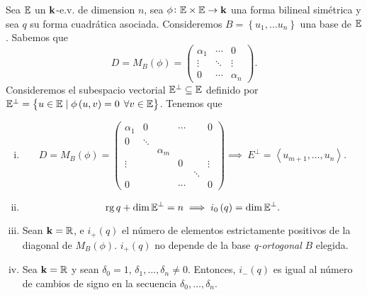 \begin{prop}
    Sea $\mathbb{E}$ un $\mathbf{k}$-e.v. de dimension $n$, sea $\phi \colon \mathbb{E} \times \mathbb{E} \to \mathbf{k}$
    una forma bilineal simétrica y sea $q$ su forma cuadrática asociada.
    Consideremos $B=\left\{ u_1, \dots u_n\right\}$ una base  de $\mathbb{E}$.
    Sabemos que
    \[
        D=M_B \left( \phi \right)= \left(
        \begin{array}{ccc}
            \alpha _1 & \cdots & 0 \\
            \vdots & \ddots & \vdots \\
            0 & \cdots & \alpha _n
        \end{array} \right).
    \]
    Consideremos el subespacio vectorial $\mathbb{E} ^{\perp} \subseteq \mathbb{E}$ definido por
    $\E ^{\perp}= \left\{u \in \E \hspace{0,1cm} | \hspace{0,1cm} \phi \left( u, v \right)
    = 0 \hspace{0,15cm} \forall v \in \E \right\}$. Tenemos que
    \begin{enumerate}[i)]
        \item
            \[
                D=M_B \left( \phi \right)= \left(
                \begin{array}{cccccc}
                    \alpha _1 & 0 &  & \cdots &  & 0 \\
                    0 & \ddots &  &  &  &  \\
                     &  & \alpha _m &  &  & \\
                    \vdots &  &  & 0 &  & \vdots  \\
                     &  & \ &  & \ddots &  \\
                    0 &  &  & \cdots &  & 0
                \end{array} \right) \implies\ E ^{\perp} =
                \left< u_{m+1} , \dots , u_n \right> .
            \]
        \item
            \[
                \operatorname{rg} q + \dim \mathbb{E}^{\perp} = n \implies i_0 \left( q \right)
                 = \dim \mathbb{E}^{\perp}.
            \]
        \item Sean $\mathbf{k}=\mathbb{R}$,  e $i_+ \left( q \right)$ el número de elementos estrictamente positivos de
        la diagonal de $M_B \left( \phi \right)$. $i_+ \left( q \right)$ no depende de la base
        \emph{q-ortogonal} $B$ elegida.
        \item Sea $\mathbf{k}=\mathbb{R}$ y sean $\delta _0 = 1$, $\delta _1, \dots , \delta _n \neq 0$.
        Entonces, $i_- \left( q \right)$ es igual al número de cambios de signo en la
        secuencia $\delta _0, \dots , \delta _n$.
    \end{enumerate}
\end{prop}
